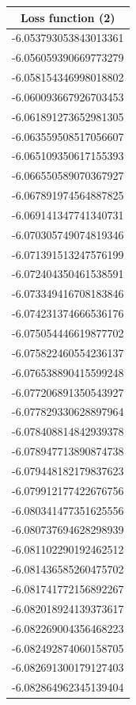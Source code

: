 \documentclass[a4paper]{article}
\begin{document}
\begin{table}[H]
\begin{multicols}{3}
\begin{tabular}{|c|}%
\hline
\bfseries Loss function (2) \\%
\hline
-6.053793053843013361 \\ \hline
-6.056059390669773279 \\ \hline
-6.058154346998018802 \\ \hline
-6.060093667926703453 \\ \hline
-6.061891273652981305 \\ \hline
-6.063559508517056607 \\ \hline
-6.065109350617155393 \\ \hline
-6.066550589070367927 \\ \hline
-6.067891974564887825 \\ \hline
-6.069141347741340731 \\ \hline
-6.070305749074819346 \\ \hline
-6.071391513247576199 \\ \hline
-6.072404350461538591 \\ \hline
-6.073349416708183846 \\ \hline
-6.074231374666536176 \\ \hline
-6.075054446619877702 \\ \hline
-6.075822460554236137 \\ \hline
-6.076538890415599248 \\ \hline
-6.077206891350543927 \\ \hline
-6.077829330628897964 \\ \hline
-6.078408814842939378 \\ \hline
-6.078947713890874738 \\ \hline
-6.079448182179837623 \\ \hline
-6.079912177422676756 \\ \hline
-6.080341477351625556 \\ \hline
-6.080737694628298939 \\ \hline
-6.081102290192462512 \\ \hline
-6.081436585260475702 \\ \hline
-6.081741772156892267 \\ \hline
-6.082018924139373617 \\ \hline
-6.082269004356468223 \\ \hline
-6.082492874060158705 \\ \hline
-6.082691300179127403 \\ \hline
-6.082864962345139404 \\ \hline

\end{tabular}
\end{multicols}
\end{table}
\end{document}
